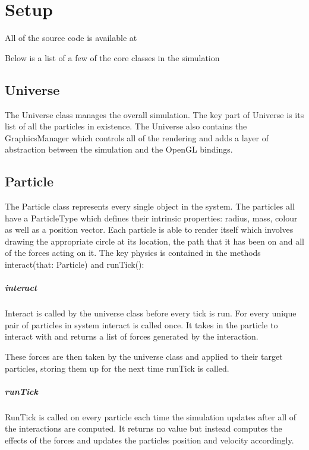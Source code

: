 \section{Setup}
	
	\sloppy
	All of the source code is available at 
	
	Below is a list of a few of the core classes in the simulation
	
	\subsection{Universe}
		\fussy	
		The Universe class manages the overall simulation. The key part of Universe is its list of all the particles in existence. The Universe also contains the GraphicsManager which controls all of the rendering and adds a layer of abstraction between the simulation and the OpenGL bindings. 
		
	\subsection{Particle}
		
		The Particle class represents every single object in the system. The particles all have a ParticleType which defines their intrinsic properties: radius, mass, colour as well as a position vector. Each particle is able to render itself which involves drawing the appropriate circle at its location, the path that it has been on and all of the forces acting on it.
		\linebreak\linebreak
		The key physics is contained in the methods interact(that: Particle) and runTick():
		
		\subparagraph{interact}
		
			Interact is called by the universe class before every tick is run. For every unique pair of particles in system interact is called once. It takes in the particle to interact with and returns a list of forces generated by the interaction.
			
			These forces are then taken by the universe class and applied to their target particles, storing them up for the next time runTick is called.
		
		\subparagraph{runTick}
			
			RunTick is called on every particle each time the simulation updates after all of the interactions are computed. It returns no value but instead computes the effects of the forces and updates the particles position and velocity accordingly.
			
